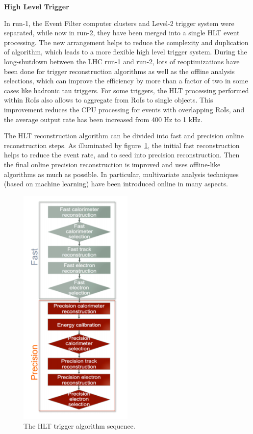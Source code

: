 \textbf{High Level Trigger}

In run-1, the Event Filter computer clusters and Level-2 trigger system were separated,
while now in run-2, they have been merged into a single HLT event processing.
The new arrangement helps to reduce the complexity and duplication of algorithm, which leads to a more flexible high level trigger system.
During the long-shutdown between the LHC run-1 and run-2, lots of reoptimizations have been done for trigger reconstruction algorithms as well as the offline analysis selections,
which can improve the efficiency by more than a factor of two in some cases like hadronic tau triggers.
For some triggers, the HLT processing performed within RoIs also allows to aggregate from RoIs to single objects. 
This improvement reduces the CPU processing for events with overlapping RoIs, and the average output rate has been increased from 400 Hz to 1 kHz.

The HLT reconstruction algorithm can be divided into fast and precision online reconstruction steps. 
As illuminated by figure~\ref{fig:trig_alg}, the initial fast reconstruction helps to reduce the event rate, and to seed into precision reconstruction.
Then the final online precision reconstruction is improved and uses offline-like algorithms as much as possible.
In particular, multivariate analysis techniques (based on machine learning) have been introduced online in many aspects.
\begin{figure}[!htb]
  \centering
  \includegraphics[width=0.5\textwidth]{figures/Detector/trig_alg.png}
  \caption{ The HLT trigger algorithm sequence\cite{Pasztor:2063746}.}
  \label{fig:trig_alg}
\end{figure}

